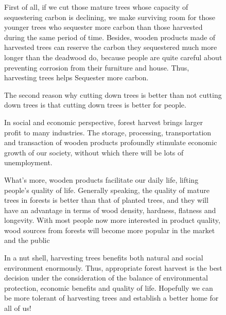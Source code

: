 \documentclass{mcmthesis}
\numberwithin{figure}{section}
\numberwithin{table}{section}
\numberwithin{equation}{section}
\begin{document}
\begin{memo}
\begin{figure}[ht]
\begin{minipage}[htbp]{0.475\linewidth}
      First of all, if we cut those mature trees whose capacity of sequestering carbon is declining, 
      we make surviving room for those younger trees who sequester more carbon 
      than those harvested during the same period of time. 
      Besides, wooden products made of harvested trees can reserve the carbon they 
      sequestered much more longer than the deadwood do, because people are quite careful
      about preventing corrosion from their furniture and house. 
      Thus, harvesting trees helps Sequester more carbon.
      \par
      The second reason why cutting down trees is better than not cutting down trees is that 
      cutting down trees is better for people.
      \par
      In social and economic perspective, forest harvest brings larger profit to many 
      industries. The storage, processing, transportation and transaction of wooden 
      products profoundly stimulate economic growth of our society, without which 
      there will be lots of unemployment.
      \par
      What's more, wooden products facilitate our daily life, lifting people's quality 
      of life. Generally speaking, the quality of mature trees in forests is better 
      than that of planted trees, and they will have an advantage in terms of wood
      density, hardness, flatness and longevity. With most people now more interested 
      in product quality, wood sources from forests will become more popular in the 
      market and the public
      \par
      In a nut shell, harvesting trees benefits both natural and social environment 
      enormously. Thus, appropriate forest harvest is the best decision under the 
      consideration of the balance of environmental protection, economic benefits 
      and quality of life. Hopefully we can be more tolerant of harvesting trees and 
      establish a better home for all of us!

    \end{minipage}

  \end{figure}
\end{memo}




\newpage




\end{document}
